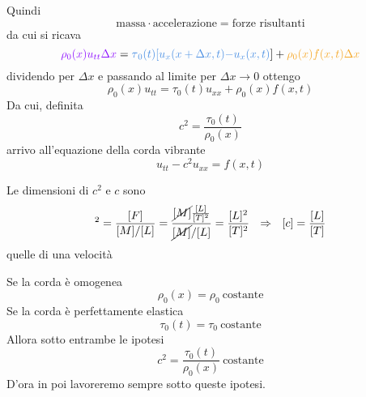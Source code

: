 \documentclass[10pt,a4paper,twoside,openright]{book}
\begin{document}
Quindi
\begin{equation*}
\text{massa} \cdotp \text{accelerazione} =\text{forze risultanti}
\end{equation*}
da cui si ricava
\begin{equation*}
\textcolor[rgb]{0.56,0.07,1}{\rho _{0}( x) u_{tt} \Delta x} =\textcolor[rgb]{0.29,0.56,0.89}{\tau }\textcolor[rgb]{0.29,0.56,0.89}{_{0}}\textcolor[rgb]{0.29,0.56,0.89}{(}\textcolor[rgb]{0.29,0.56,0.89}{t}\textcolor[rgb]{0.29,0.56,0.89}{)}\textcolor[rgb]{0.29,0.56,0.89}{[}\textcolor[rgb]{0.29,0.56,0.89}{u}\textcolor[rgb]{0.29,0.56,0.89}{_{x}}\textcolor[rgb]{0.29,0.56,0.89}{(}\textcolor[rgb]{0.29,0.56,0.89}{x+\Delta x,t}\textcolor[rgb]{0.29,0.56,0.89}{)}\textcolor[rgb]{0.29,0.56,0.89}{-u}\textcolor[rgb]{0.29,0.56,0.89}{_{x}}\textcolor[rgb]{0.29,0.56,0.89}{(}\textcolor[rgb]{0.29,0.56,0.89}{x,t}\textcolor[rgb]{0.29,0.56,0.89}{)}] +\textcolor[rgb]{0.96,0.65,0.14}{\rho }\textcolor[rgb]{0.96,0.65,0.14}{_{0}}\textcolor[rgb]{0.96,0.65,0.14}{(}\textcolor[rgb]{0.96,0.65,0.14}{x}\textcolor[rgb]{0.96,0.65,0.14}{)}\textcolor[rgb]{0.96,0.65,0.14}{f}\textcolor[rgb]{0.96,0.65,0.14}{(}\textcolor[rgb]{0.96,0.65,0.14}{x,t}\textcolor[rgb]{0.96,0.65,0.14}{)}\textcolor[rgb]{0.96,0.65,0.14}{\Delta x}
\end{equation*}
dividendo per $\displaystyle \Delta x$ e passando al limite per $\displaystyle \Delta x\rightarrow 0$ ottengo
\begin{equation*}
\rho _{0}( x) u_{tt} =\tau _{0}( t) u_{xx} +\rho _{0} (x)f( x,t)
\end{equation*}
Da cui, definita
\begin{equation*}
c^{2} =\frac{\tau _{0}( t)}{\rho _{0}( x)}
\end{equation*}
arrivo all'equazione della corda vibrante
\begin{equation}
\boxed{u_{tt} -c^{2} u_{xx} =f( x,t)}
\end{equation}
\begin{nb}
	Le dimensioni di $\displaystyle c^{2}$ e $\displaystyle c$ sono
	\begin{equation*}
		[ c]^{2} =\frac{[ F]}{[ M] /[ L]} =\frac{\cancel{[ M]}\frac{[ L]}{[ T]^{2}}}{\cancel{[ M]} /[ L]} =\frac{[ L]^{2}}{[ T]^{2}} \ \ \Rightarrow \ \ [ c] =\frac{[ L]}{[ T]}
	\end{equation*}
	quelle di una velocità
\end{nb}
\begin{nb}
	Se la corda è omogenea
	\begin{equation*}
		\rho _{0}( x) =\rho _{0} \ \text{costante}
	\end{equation*}
	Se la corda è perfettamente elastica
	\begin{equation*}
		\tau _{0}( t) =\tau _{0} \ \text{costante}
	\end{equation*}
	Allora sotto entrambe le ipotesi
	\begin{equation*}
		c^{2} =\frac{\tau _{0}( t)}{\rho _{0}( x)} \ \text{costante}
	\end{equation*}
	D'ora in poi lavoreremo sempre sotto queste ipotesi.
\end{nb}
\end{document}

